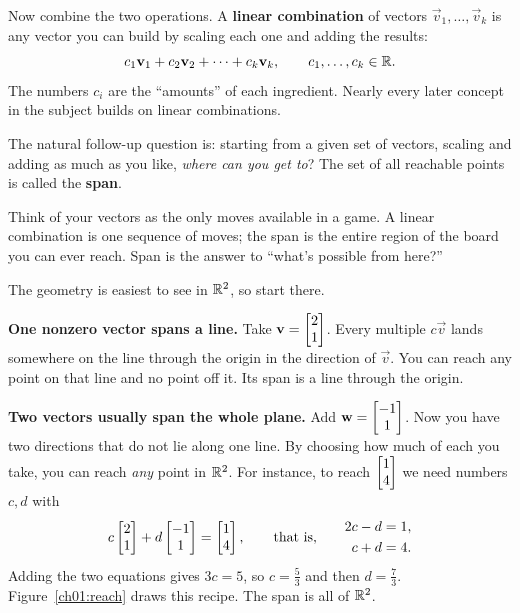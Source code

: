 Now combine the two operations. A \textbf{linear combination} of vectors $\vec v_1,\dots,\vec v_k$ is
any vector you can build by scaling each one and adding the results:
\[
c_1\mathbf{v}_1 + c_2 \mathbf{v}_2 + \dots + c_k \mathbf{v}_k,
\qquad c_1,\dots,c_k \in \mathbb{R}.
\]
The numbers $c_i$ are the ``amounts'' of each ingredient. Nearly every later concept in the subject
builds on linear combinations.

The natural follow-up question is: starting from a given set of vectors, scaling and adding as much as
you like, \emph{where can you get to}? The set of all reachable points is called the \textbf{span}.

\begin{intuitionbox}
Think of your vectors as the only moves available in a game. A linear combination is one sequence of
moves; the span is the entire region of the board you can ever reach. Span is the answer to
``what's possible from here?''
\end{intuitionbox}

The geometry is easiest to see in $\mathbb{R}^2$, so start there.

\textbf{One nonzero vector spans a line.} Take $\mathbf{v} = \begin{bmatrix}2\\1\end{bmatrix}$. Every multiple $c\vec v$ lands
somewhere on the line through the origin in the direction of $\vec v$. You can reach any point on that
line and no point off it. Its span is a line through the origin.

\textbf{Two vectors usually span the whole plane.} Add $\mathbf{w} = \begin{bmatrix}-1\\1\end{bmatrix}$. Now you have two
directions that do not lie along one line. By choosing how much of each you take, you can reach
\emph{any} point in $\mathbb{R}^2$. For instance, to reach $\begin{bmatrix}1\\4\end{bmatrix}$ we need numbers $c,d$ with
\[
c\begin{bmatrix}2\\1\end{bmatrix}+d\begin{bmatrix}-1\\1\end{bmatrix}=\begin{bmatrix}1\\4\end{bmatrix},
\qquad\text{that is,}\qquad
\begin{aligned}
2c - d &= 1,\\
c + d &= 4.
\end{aligned}
\]
Adding the two equations gives $3c=5$, so $c=\tfrac53$ and then $d=\tfrac73$.
Figure~\ref{ch01:reach} draws this recipe. The span is all of $\mathbb{R}^2$.

